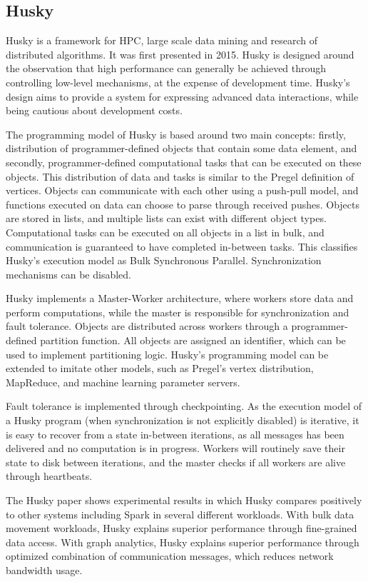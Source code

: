 \documentclass{uit-report}
\begin{document}
\subsection{Husky}
Husky \cite{husky, husky_website} is a framework for HPC, large scale data mining and research of distributed algorithms. It was first presented in 2015. Husky is designed around the observation that high performance can generally be achieved through controlling low-level mechanisms, at the expense of development time. Husky's design aims to provide a system for expressing advanced data interactions, while being cautious about development costs.

The programming model of Husky is based around two main concepts: firstly, distribution of programmer-defined objects that contain some data element, and secondly, programmer-defined computational tasks that can be executed on these objects. This distribution of data and tasks is similar to the Pregel definition of vertices. Objects can communicate with each other using a push-pull model, and functions executed on data can choose to parse through received pushes. Objects are stored in lists, and multiple lists can exist with different object types. Computational tasks can be executed on all objects in a list in bulk, and communication is guaranteed to have completed in-between tasks. This classifies Husky's execution model as Bulk Synchronous Parallel. Synchronization mechanisms can be disabled.

Husky implements a Master-Worker architecture, where workers store data and perform computations, while the master is responsible for synchronization and fault tolerance. Objects are distributed across workers through a programmer-defined partition function. All objects are assigned an identifier, which can be used to implement partitioning logic. Husky's programming model can be extended to imitate other models, such as Pregel's vertex distribution, MapReduce, and machine learning parameter servers.

Fault tolerance is implemented through checkpointing. As the execution model of a Husky program (when synchronization is not explicitly disabled) is iterative, it is easy to recover from a state in-between iterations, as all messages has been delivered and no computation is in progress. Workers will routinely save their state to disk between iterations, and the master checks if all workers are alive through heartbeats. 

The Husky paper shows experimental results in which Husky compares positively to other systems including Spark in several different workloads. With bulk data movement workloads, Husky explains superior performance through fine-grained data access. With graph analytics, Husky explains superior performance through optimized combination of communication messages, which reduces network bandwidth usage. 
\end{document}
